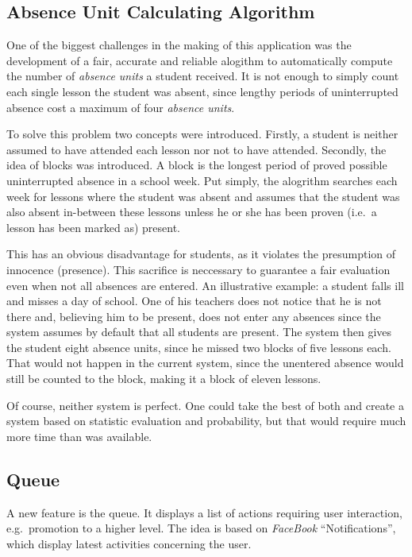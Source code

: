 \documentclass[12pt,a4paper,twoside,openany]{report}
\begin{document}
\subsection{Absence Unit Calculating Algorithm}
One of the biggest challenges in the making of this application was the
development of a fair, accurate and reliable alogithm to automatically compute
the number of \textit{absence units} a student received. It is not enough to simply
count each single lesson the student was absent, since lengthy periods of uninterrupted absence cost
a maximum of four \textit{absence units}.

To solve this problem two concepts were introduced. Firstly, a student is
neither assumed to have attended each lesson nor not to have attended.
Secondly, the idea of blocks was introduced. A block is the longest period of
proved possible uninterrupted absence in a school week. Put simply, the
alogrithm searches each week for lessons where the student was absent and
assumes that the student was also absent in-between these lessons unless he or
she has been proven (i.e.\ a lesson has been marked as) present.

This has an obvious disadvantage for students, as it violates the
presumption of innocence (presence). This sacrifice is neccessary to guarantee a
fair evaluation even when not all absences are entered. An illustrative example:
a student falls ill and misses a day of school. One of his teachers does not
notice that he is not there and, believing him to be present, does not enter any absences since the system
assumes by default that all students are present. The system then gives the
student eight absence units, since he missed two blocks of five lessons each.
That would not happen in the current system, since the unentered absence would
still be counted to the block, making it a block of eleven lessons.

Of course, neither system is perfect. One could take the best of both and create
a system based on statistic evaluation and probability, but that would require
much more time than was available.

\subsection{Queue}
A new feature is the queue. It displays a list of actions requiring user
interaction, e.g.\ promotion to a higher level. The idea is based on \textit{FaceBook}
``Notifications'', which display latest activities concerning the user.
\end{document}
